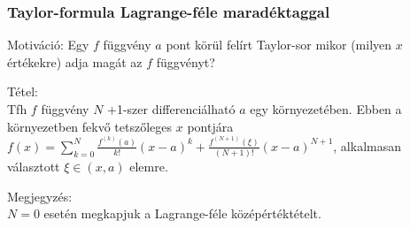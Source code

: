 \documentclass[12pt,a4paper]{scrartcl}
\newenvironment{tetel}{}{}
\newenvironment{megjegyzes}{}{}
\begin{document}
\hypertarget{taylor-formula-lagrange-fele-maradektaggal}{%
\subsubsection{Taylor-formula Lagrange-féle
maradéktaggal}\label{taylor-formula-lagrange-fele-maradektaggal}}

Motiváció: Egy \(f\) függvény \(a\) pont körül felírt Taylor-sor mikor
(milyen \(x\) értékekre) adja magát az \(f\) függvényt?

\begin{tetel}

Tétel:\\
Tfh \(f\) függvény \(N\) +1-szer differenciálható \(a\) egy
környezetében. Ebben a környezetben fekvő tetszőleges \(x\) pontjára
\(f\left( x \right) = {\sum\limits_{k = 0}^{N}{\frac{f^{(k)}\left( a \right)}{k!}\left( {x - a} \right)^{k} +}}\frac{f^{({N + 1})}\left( \xi \right)}{\left( {N + 1} \right)!}\left( {x - a} \right)^{N + 1}\),
alkalmasan választott \(\xi \in \left( {x,a} \right)\) elemre.

\end{tetel}

\begin{megjegyzes}

Megjegyzés:\\
\(N = 0\) esetén megkapjuk a Lagrange-féle középértéktételt.

\end{megjegyzes}
\end{document}
